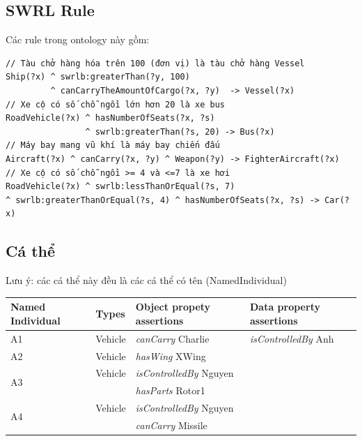 {\subsection{SWRL Rule}
Các rule trong ontology này gồm:
\begin{verbatim}
// Tàu chở hàng hóa trên 100 (đơn vị) là tàu chở hàng Vessel
Ship(?x) ^ swrlb:greaterThan(?y, 100) 
         ^ canCarryTheAmountOfCargo(?x, ?y)  -> Vessel(?x)
// Xe cộ có số chỗ ngồi lớn hơn 20 là xe bus
RoadVehicle(?x) ^ hasNumberOfSeats(?x, ?s)
                ^ swrlb:greaterThan(?s, 20) -> Bus(?x)
// Máy bay mang vũ khí là máy bay chiến đấu
Aircraft(?x) ^ canCarry(?x, ?y) ^ Weapon(?y) -> FighterAircraft(?x)
// Xe cộ có số chỗ ngồi >= 4 và <=7 là xe hơi
RoadVehicle(?x) ^ swrlb:lessThanOrEqual(?s, 7) 
^ swrlb:greaterThanOrEqual(?s, 4) ^ hasNumberOfSeats(?x, ?s) -> Car(?x)
\end{verbatim}
\subsection{Cá thể}
Lưu ý: các cá thể này đều là các cá thể có tên (NamedIndividual)
\begin{table}[ht!]
\centering
\begin{tabular}{|p{2cm}|l|p{5cm}|p{5cm}|}
\hline
Named Individual & Types & Object propety assertions & Data property assertions \\ \hline
A1 & Vehicle & \textit{canCarry} Charlie & \textit{isControlledBy} Anh \\ \hline
A2 & Vehicle & \textit{hasWing} XWing &  \\ \hline
\multirow{2}{*}{A3} & Vehicle & \textit{isControlledBy} Nguyen &  \\ 
& &\textit{hasParts} Rotor1 & \\ \hline
\multirow{2}{*}{A4} & Vehicle & \textit{isControlledBy} Nguyen &  \\ 
& &\textit{canCarry} Missile & \\ \hline
  

\end{tabular}
\end{table}}
